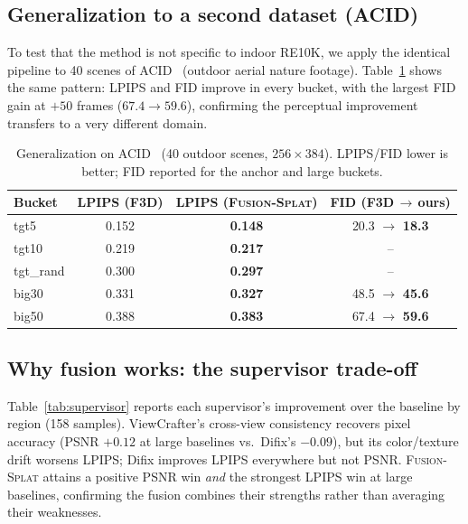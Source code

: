 \documentclass[10pt,twocolumn,letterpaper]{article}
\newcommand{\method}{\textsc{Fusion-Splat}}
\begin{document}
\subsection{Generalization to a second dataset (ACID)}
To test that the method is not specific to indoor RE10K, we apply the identical
pipeline to 40 scenes of ACID~\cite{acid} (outdoor aerial nature footage).
Table~\ref{tab:acid} shows the same pattern: LPIPS and FID improve in every
bucket, with the largest FID gain at $+50$ frames ($67.4\!\to\!59.6$),
confirming the perceptual improvement transfers to a very different domain.

\begin{table}[t]
\centering
\small
\caption{Generalization on ACID~\cite{acid} (40 outdoor scenes, $256{\times}384$).
LPIPS/FID lower is better; FID reported for the anchor and large buckets.}
\label{tab:acid}
\begin{tabular}{lccc}
\toprule
Bucket & LPIPS (F3D) & LPIPS (\method) & FID (F3D\,$\to$\,ours) \\
\midrule
tgt5      & 0.152 & \textbf{0.148} & 20.3 $\to$ \textbf{18.3} \\
tgt10     & 0.219 & \textbf{0.217} & -- \\
tgt\_rand & 0.300 & \textbf{0.297} & -- \\
big30     & 0.331 & \textbf{0.327} & 48.5 $\to$ \textbf{45.6} \\
big50     & 0.388 & \textbf{0.383} & 67.4 $\to$ \textbf{59.6} \\
\bottomrule
\end{tabular}
\end{table}

\subsection{Why fusion works: the supervisor trade-off}
Table~\ref{tab:supervisor} reports each supervisor's improvement over the
baseline by region (158 samples). ViewCrafter's cross-view consistency recovers
pixel accuracy (PSNR $+0.12$ at large baselines vs.\ Difix's $-0.09$), but its
color/texture drift worsens LPIPS; Difix improves LPIPS everywhere but not PSNR.
\method{} attains a positive PSNR win \emph{and} the strongest LPIPS win at
large baselines, confirming the fusion combines their strengths rather than
averaging their weaknesses.
\end{document}
